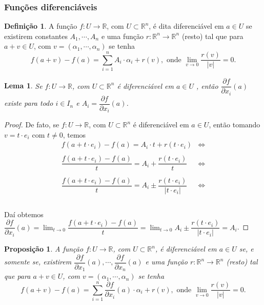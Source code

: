 \documentclass{article}
\newtheorem{prop}{Proposição}[section]
\theoremstyle{theorem}
\theoremstyle{lemma}
\newtheorem{lema}{Lema}
\theoremstyle{definition}
\newtheorem{definicao}{Definição}[section]
\theoremstyle{remark}
\begin{document}
   \subsubsection{Funções diferenciáveis}
   \begin{definicao}
	   A função \( f:U\to \mathbb{R} \), com \(U \subset \mathbb{R}^n \),   é dita diferenciável em \(a\in U\) se existirem constantes \( A_1,\cdots, A_n\)  e uma função \(r: \mathbb{R}^n \to \mathbb{R}^n\) (resto) tal que para \(a+v\in U\), com \( v = (\alpha_1, \cdots , \alpha_n ) \)  se tenha \[ f(a+v) - f(a) = \sum_{i=1}^n A_i \cdot \alpha_i  + r(v), \text{ onde } \lim_{v \to 0} \dfrac{r(v)}{|v|} = 0.\]
   \end{definicao}
   \begin{lema}
	   Se \(f:U\to \mathbb{R}\), com \( U \subset \mathbb{R}^n \) é diferenciável em \( a\in U \) , então \( \dfrac{\partial f}{\partial x_i } (a)  \) existe para todo \(i \in I_n\) e \( A_i = \dfrac{\partial f}{\partial x_i }(a) \).
   \end{lema}
   \begin{proof}
	   De fato, se \(f:U\to \mathbb{R}\), com \( U \subset \mathbb{R}^n \) é diferenciável em \(a\in U \), então tomando \(v = t\cdot e_i \) com \(t\neq 0\), temos 
	   \begin{align*}
		   f(a+t\cdot e_i ) - f(a)  =  A_i \cdot t + r(t\cdot e_i)  &\iff\\~\\
		   \dfrac{f(a+t\cdot e_i ) - f(a)}{t}  =  A_i  + \dfrac{r(t\cdot e_i)}{t}  &\iff\\~\\
		   \dfrac{f(a+t\cdot e_i ) - f(a)}{t}  =  A_i  \pm \dfrac{r(t\cdot e_i)}{|t\cdot e_i |}  &\iff\\~\\
	   \end{align*}

	   Daí obtemos \( \dfrac{\partial f}{\partial x_i} (a) =\displaystyle \lim_{t \to 0} \dfrac{f(a+t\cdot e_i ) - f(a)}{t}  = \displaystyle \lim_{t \to 0}  A_i  \pm \dfrac{r(t\cdot e_i)}{|t\cdot e_i |} = A_i \).  
   \end{proof}
   \begin{prop}
	   A função \( f:U\to \mathbb{R} \), com \(U \subset \mathbb{R}^n \),   é diferenciável em \(a\in U\) se, e somente se, existirem \( \dfrac{\partial f}{\partial x_1}(a) , \cdots , \dfrac{\partial f}{\partial x_n}(a)  \)   e uma função \(r: \mathbb{R}^n \to \mathbb{R}^n\) (resto) tal que para \(a+v\in U\), com \( v = (\alpha_1, \cdots , \alpha_n ) \)  se tenha \[ f(a+v) - f(a) = \sum_{i=1}^n \dfrac{\partial f}{\partial x_i}(a) \cdot \alpha_i  + r(v), \text{ onde } \lim_{v \to 0} \dfrac{r(v)}{|v|} = 0.\]
   \end{prop}
\end{document}
